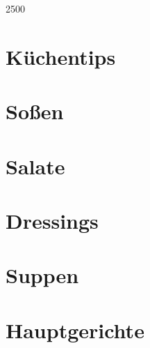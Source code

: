 \documentclass[10pt, a4paper, twoside]{book} %
\makeatletter
\newcommand\GRAANDE{\@setfontsize\Huge{250}{0}}
\makeatother
\begin{document}
\renewcommand{\indexname}{S\-t\-i\-c\-h\-w\-o\-r\-t\-v\-e\-r\-z\-e\-i\-c\-h\-n\-i\-s}

\justify
\setlength\parindent{0pt}

\thispagestyle{empty}
\vspace*{3cm}
\begin{center}
{\GRAANDE{\textsc{}}}
\vspace{2cm}
\end{center}
\vspace{3cm}
\newpage

\tableofcontents

\cleardoublepage
\printindex

\cleardoublepage
{}

\chapter{K\-ü\-c\-h\-e\-n\-t\-i\-p\-s}
\thispagestyle{empty}

\chapter{S\-o\-ß\-e\-n}
\thispagestyle{empty}




\chapter{S\-a\-l\-a\-t\-e}
\thispagestyle{empty}

\chapter{D\-r\-e\-s\-s\-i\-n\-g\-s}
\thispagestyle{empty}




\chapter{S\-u\-p\-p\-e\-n}
\thispagestyle{empty}




\chapter{H\-a\-u\-p\-t\-g\-e\-r\-i\-c\-h\-t\-e}
\thispagestyle{empty}







\end{document}
